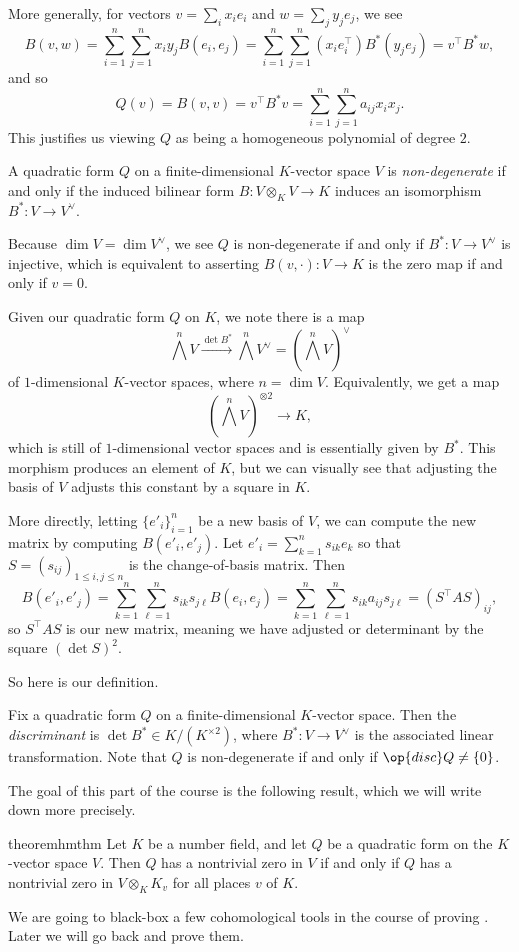 \documentclass[../notes.tex]{subfiles}
\begin{document}
More generally, for vectors $v=\sum_ix_ie_i$ and $w=\sum_jy_je_j$, we see
\[B(v,w)=\sum_{i=1}^n\sum_{j=1}^nx_iy_jB(e_i,e_j)=\sum_{i=1}^n\sum_{j=1}^n(x_ie_i^\intercal)B^*(y_je_j)=v^\intercal B^*w,\]
and so
\[Q(v)=B(v,v)=v^\intercal B^*v=\sum_{i=1}^n\sum_{j=1}^na_{ij}x_ix_j.\]
This justifies us viewing $Q$ as being a homogeneous polynomial of degree $2$.
\begin{definition}
	A quadratic form $Q$ on a finite-dimensional $K$-vector space $V$ is \textit{non-degenerate} if and only if the induced bilinear form $B\colon V\otimes_KV\to K$ induces an isomorphism $B^*\colon V\to V^\lor$.
\end{definition}
\begin{remark} \label{rem:non-degenerate-bilin}
	Because $\dim V=\dim V^\lor$, we see $Q$ is non-degenerate if and only if $B^*\colon V\to V^\lor$ is injective, which is equivalent to asserting $B(v,\cdot)\colon V\to K$ is the zero map if and only if $v=0$.
\end{remark}
Given our quadratic form $Q$ on $K$, we note there is a map
\[\bigwedge^nV\xrightarrow{\det B^*}\bigwedge^nV^\lor=\left(\bigwedge^nV\right)^\lor\]
of $1$-dimensional $K$-vector spaces, where $n=\dim V$. Equivalently, we get a map
\[\left(\bigwedge^nV\right)^{\otimes2}\to K,\]
which is still of $1$-dimensional vector spaces and is essentially given by $B^*$. This morphism produces an element of $K$, but we can visually see that adjusting the basis of $V$ adjusts this constant by a square in $K$.

More directly, letting $\{e'_i\}_{i=1}^n$ be a new basis of $V$, we can compute the new matrix by computing $B(e'_i,e'_j)$. Let $e'_i=\sum_{k=1}^ns_{ik}e_k$ so that $S=(s_{ij})_{1\le i,j\le n}$ is the change-of-basis matrix. Then
\[B(e'_i,e'_j)=\sum_{k=1}^n\sum_{\ell=1}^ns_{ik}s_{j\ell}B(e_i,e_j)=\sum_{k=1}^n\sum_{\ell=1}^ns_{ik}a_{ij}s_{j\ell}=(S^\intercal AS)_{ij},\]
so $S^\intercal AS$ is our new matrix, meaning we have adjusted or determinant by the square $(\det S)^2$.

So here is our definition.
\begin{definition}[discriminant]
	Fix a quadratic form $Q$ on a finite-dimensional $K$-vector space. Then the \textit{discriminant} is $\det B^*\in K/\left(K^{\times2}\right)$, where $B^*\colon V\to V^\lor$ is the associated linear transformation. Note that $Q$ is non-degenerate if and only if $\op{disc}Q\ne\{0\}$.
\end{definition}
The goal of this part of the course is the following result, which we will write down more precisely.
\begin{restatable}{theorem}{hmthm} \label{thm:hasse-mink}
	Let $K$ be a number field, and let $Q$ be a quadratic form on the $K$-vector space $V$. Then $Q$ has a nontrivial zero in $V$ if and only if $Q$ has a nontrivial zero in $V\otimes_KK_v$ for all places $v$ of $K$.
\end{restatable}
\noindent We are going to black-box a few cohomological tools in the course of proving . Later we will go back and prove them.
\end{document}
